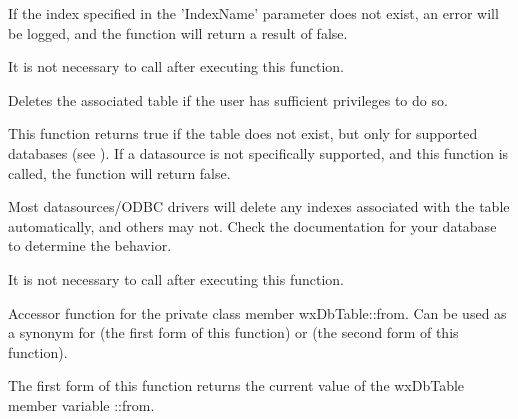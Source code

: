 
If the index specified in the 'IndexName' parameter does not exist, an error
will be logged, and the function will return a result of false.

It is not necessary to call 
after executing this function.

\label{wxdbtabledroptable}


Deletes the associated table if the user has sufficient privileges to do so.


This function returns true if the table does not exist, but only for
supported databases (see ).  If a datasource
is not specifically supported, and this function is called, the function
will return false.

Most datasources/ODBC drivers will delete any indexes associated with the
table automatically, and others may not.  Check the documentation for your
database to determine the behavior.

It is not necessary to call 
after executing this function.

\label{wxdbtablefrom}



Accessor function for the private class member wxDbTable::from.  Can be used
as a synonym for 
(the first form of this function) or
 (the second form
of this function).




The first form of this function returns the current value of the wxDbTable
member variable ::from.

